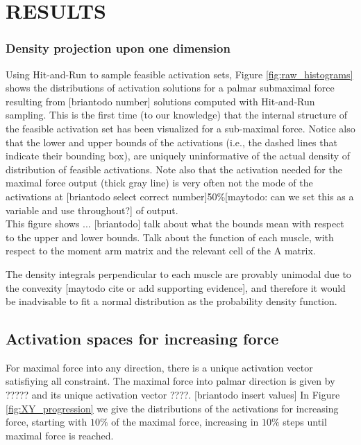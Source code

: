 

\section{RESULTS}
\subsubsection{Density projection upon one dimension} %
\label{ssub:density_projection_upon_one_dimension}

Using Hit-and-Run to sample feasible activation sets, Figure \ref{fig:raw_histograms} shows the distributions of activation solutions for a palmar submaximal force resulting from [briantodo number] solutions computed with Hit-and-Run sampling. This is the first time (to our knowledge) that the internal structure of the feasible activation set has been visualized for a sub-maximal force.
Notice also that the lower and upper bounds of the activations (i.e., the dashed lines that indicate their bounding box), are uniquely uninformative of the actual density of distribution of feasible activations. Note also that the activation needed for the maximal force output (thick gray line) is very often not the mode of the activations at [briantodo select correct number]50\%[maytodo: can we set this as a variable and use throughout?] of output.
\\
This figure shows ... [briantodo]
talk about what the bounds mean with respect to the upper and lower bounds.
Talk about the function of each muscle, with respect to the moment arm matrix and the relevant cell of the A matrix.

The density integrals perpendicular to each muscle are provably unimodal due to the convexity [maytodo cite or add supporting evidence], and therefore it would be inadvisable to fit a normal distribution as the probability density function.


\subsection{Activation spaces for increasing force} %
\label{sub:activation_spaces_for_increasing_force}
For maximal force into any direction, there is a unique activation vector satisfiying all constraint. The maximal force into palmar direction is given by ????? and its unique activation vector ????. [briantodo insert values]
In Figure \ref{fig:XY_progression} we give the distributions of the activations for increasing force, starting with $10\%$ of the maximal force, increasing in $10\%$ steps until maximal force is reached.

